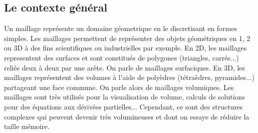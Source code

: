 

\subsection*{Le contexte général}
\noindent
Un maillage représente un domaine géometrique en le discretisant en formes simples. Les maillages permettent de représenter des objets géométriques en 1, 2 ou 3D à des fins scientifiques ou industrielles par exemple. En 2D, les maillages representent des surfaces et sont constitués de polygones (triangles, carrés...) reliés deux à deux par une arête. On parle de maillages surfaciques. En 3D, les maillages représentent des volumes à l'aide de polyèdres (tétraèdres, pyramides...) partageant une face commune. On parle alors de maillages volumiques. Les maillages sont très utilisés pour la visualisation de volume, calculs de solutions pour des équations aux dérivées partielles... Cependant, ce sont des structures complexes qui peuvent devenir très volumineuses et dont on essaye de réduire la taille mémoire.

